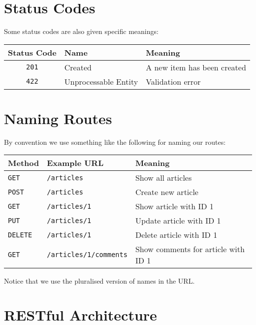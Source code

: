 \section{Status Codes}

Some status codes are also given specific meanings:
\\

\begin{tabu}{| c | l | X |}
    \hline
    \textbf{Status Code} & \textbf{Name} & \textbf{Meaning} \\
    \hline
    \texttt{201} & Created & A new item has been created \\
    \texttt{422} & Unprocessable Entity & Validation error \\
    \hline
\end{tabu}



\section{Naming Routes}

By convention we use something like the following for naming our routes:
\\

\begin{tabu}{| l | l | X |}
    \hline
    \textbf{Method} & \textbf{Example URL} & \textbf{Meaning} \\
    \hline
    \texttt{GET} & \texttt{/articles} & Show all articles\\
    \texttt{POST} & \texttt{/articles} & Create new article\\
    \texttt{GET} & \texttt{/articles/1} & Show article with ID 1\\
    \texttt{PUT} & \texttt{/articles/1} & Update article with ID 1\\
    \texttt{DELETE} & \texttt{/articles/1} & Delete article with ID 1\\
    \texttt{GET} & \texttt{/articles/1/comments} & Show comments for article with ID 1\\
    \hline
\end{tabu}

\par\bigskip

Notice that we use the pluralised version of names in the URL.


\pagebreak


\section{RESTful Architecture}

